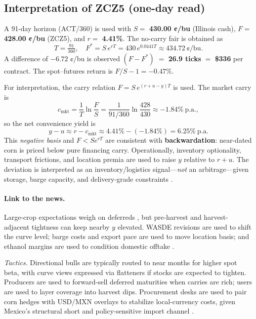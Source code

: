 \documentclass[10pt,a4paper]{article} %
\begin{document}
\subsection{Interpretation of \texorpdfstring{ZCZ5}{ZCZ5} (one-day read)}
A 91-day horizon (ACT/360) is used with \(S=\) \textbf{430.00 ¢/bu} (Illinois cash), \(F=\) \textbf{428.00 ¢/bu} (ZCZ5), and \(r=\) \textbf{4.41\%}. The no-carry fair is obtained as
\[
T=\tfrac{91}{360},\quad F^{*}=S\,e^{rT}=430\,e^{0.0441T}\approx \mathbf{434.72}\ \text{¢/bu}.
\]
A difference of \(\mathbf{-6.72}\) ¢/bu is observed \((F-F^{*})\) \(=\) \textbf{26.9 ticks} \(=\) \textbf{\$336} per contract. The spot–futures return is \(F/S-1=\mathbf{-0.47\%}\).

For interpretation, the carry relation \(F=S\,e^{(r+u-y)T}\) is used. The market carry is
\[
c_{\text{mkt}}=\frac{1}{T}\ln\!\frac{F}{S}
=\frac{1}{91/360}\ln\!\frac{428}{430}\approx \mathbf{-1.84\%}\ \text{p.a.},
\]
so the net convenience yield is
\[
y-u \approx r-c_{\text{mkt}}\approx 4.41\%-(-1.84\%)=\mathbf{6.25\%}\ \text{p.a.}
\]
This \emph{negative basis} and \(F<S e^{rT}\) are consistent with \textbf{backwardation}: near-dated corn is priced below pure financing carry. Operationally, inventory optionality, transport frictions, and location premia are used to raise \(y\) relative to \(r+u\). The deviation is interpreted as an inventory/logistics signal—\emph{not} an arbitrage—given storage, barge capacity, and delivery-grade constraints \citep{ams_gtr_2023,ncga_storage_2025}.

\paragraph{Link to the news.}
Large-crop expectations weigh on deferreds \citep{reuters_record_crop_2025}, but pre-harvest and harvest-adjacent tightness can keep nearby \(y\) elevated. WASDE revisions are used to shift the curve level; barge costs and export pace are used to move location basis; and ethanol margins are used to condition domestic offtake \citep{usda_wasde,ams_gtr_2023,ers_ethanol_40}.

\medskip
\noindent\emph{Tactics.} Directional bulls are typically routed to near months for higher spot beta, with curve views expressed via flatteners if stocks are expected to tighten. Producers are used to forward-sell deferred maturities when carries are rich; users are used to layer coverage into harvest dips. Procurement desks are used to pair corn hedges with USD/MXN overlays to stabilize local-currency costs, given Mexico’s structural short and policy-sensitive import channel \citep{fas_mexico_grain_annual_2025}.
\end{document}
